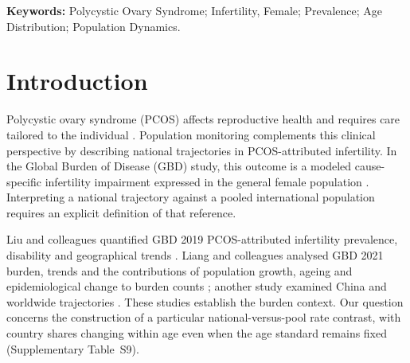 \documentclass[11pt,a4paper]{article}
\begin{document}
\begin{abstract}
\noindent\textbf{LIMITATIONS, REASONS FOR CAUTION:} Uncertainty in component magnitudes and near-zero contrast signs remains unquantified. The signed net denominator contains opposing components, so 58.5\% is an accounting ratio. Rounded published age weights and the economically selected G20 reference also limit interpretation.

\noindent\textbf{WIDER IMPLICATIONS OF THE FINDINGS:} Reproductive-health monitoring against pooled populations should report reference weights and absolute components alongside net differences. Doing so distinguishes changes in national rates from changes in the population represented by the benchmark.

\noindent\textbf{FUNDING:} XX: verified funding sources and funder roles to be completed by the authors at submission.

\noindent\textbf{DISCLOSURES:} XX: author-specific disclosures to be completed at submission.

\noindent\textbf{TRIAL REGISTRATION NUMBER:} Not applicable; this is a secondary analysis of aggregate estimates, not a clinical trial.
\end{abstract}
\endgroup

\textbf{Keywords:} Polycystic Ovary Syndrome; Infertility, Female; Prevalence; Age Distribution; Population Dynamics.

\section{Introduction}
Polycystic ovary syndrome (PCOS) affects reproductive health and requires care tailored to the individual \citep{pcos}. Population monitoring complements this clinical perspective by describing national trajectories in PCOS-attributed infertility. In the Global Burden of Disease (GBD) study, this outcome is a modeled cause-specific infertility impairment expressed in the general female population \citep{gbd}. Interpreting a national trajectory against a pooled international population requires an explicit definition of that reference.

Liu and colleagues quantified GBD 2019 PCOS-attributed infertility prevalence, disability and geographical trends \citep{liu_pcos2024}. Liang and colleagues analysed GBD 2021 burden, trends and the contributions of population growth, ageing and epidemiological change to burden counts \citep{liang_burden2025}; another study examined China and worldwide trajectories \citep{liang_trend2026}. These studies establish the burden context. Our question concerns the construction of a particular national-versus-pool rate contrast, with country shares changing within age even when the age standard remains fixed (Supplementary Table~S9).
\end{document}
